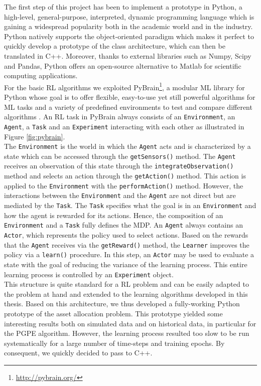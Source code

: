The first step of this project has been to implement a prototype in Python, a high-level, general-purpose, interpreted, dynamic programming language which is gaining a widespread popularity both in the academic world and in the industry. Python natively supports the object-oriented paradigm which makes it perfect to quickly develop a prototype of the class architecture, which can then be translated in C++. Moreover, thanks to external libraries such as Numpy, Scipy and Pandas, Python offers an open-source alternative to Matlab for scientific computing applications.\\
For the basic \gls{RL} algorithms we exploited PyBrain\footnote{\url{http://pybrain.org/}}, a modular \gls{ML} library for Python whose goal is to offer flexible, easy-to-use yet still powerful algorithms for \gls{ML} tasks and a variety of predefined environments to test and compare different algorithms \cite{pybrain2010jmlr}. An \gls{RL} task in PyBrain always consists of an \lstinline{Environment}, an \lstinline{Agent}, a \lstinline{Task} and an \lstinline{Experiment} interacting with each other as illustrated in Figure \ref{fig:pybrain}.\\
The \lstinline{Environment} is the world in which the \lstinline{Agent} acts and is characterized by a state which can be accessed through the \lstinline{getSensors()} method. The \lstinline{Agent} receives an observation of this state through the \lstinline{integrateObservation()} method and selects an action through the \lstinline{getAction()} method. This action is applied to the \lstinline{Environment} with the \lstinline{performAction()} method. However, the interactions between the \lstinline{Environment} and the \lstinline{Agent} are not direct but are mediated by the \lstinline{Task}. The \lstinline{Task} specifies what the goal is in an \lstinline{Environment} and how the agent is rewarded for its actions. Hence, the composition of an \lstinline{Environment} and a \lstinline{Task} fully defines the MDP. An \lstinline{Agent} always contains an \lstinline{Actor}, which represents the policy used to select actions. Based on the rewards that the \lstinline{Agent} receives via the \lstinline{getReward()} method, the \lstinline{Learner} improves the policy via a \lstinline{learn()} procedure. In this step, an \lstinline{Actor} may be used to evaluate a state with the goal of reducing the variance of the learning process. This entire learning process is controlled by an \lstinline{Experiment} object.\\ 
This structure is quite standard for a \gls{RL} problem and can be easily adapted to the problem at hand and extended to the learning algorithms developed in this thesis. Based on this architecture, we thus developed a fully-working Python prototype of the asset allocation problem. This prototype yielded some interesting results both on simulated data and on historical data, in particular for the \gls{PGPE} algorithm. However, the learning process resulted too slow to be run systematically for a large number of time-steps and training epochs. By consequent, we quickly decided to pass to C++.
